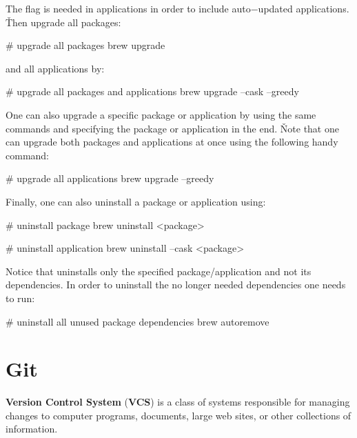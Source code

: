 The flag  is needed in applications in order to include auto$-$updated applications. \v

Then upgrade all packages:

\begin{bash}
# upgrade all packages
brew upgrade
\end{bash}

and all applications by:

\begin{bash}
# upgrade all packages and applications
brew upgrade --cask --greedy
\end{bash}

One can also upgrade a specific package or application by using the same commands and specifying the package or
application in the end. \v

Note that one can upgrade both packages and applications at once using the following handy command:

\begin{bash}
# upgrade all applications
brew upgrade --greedy
\end{bash}

Finally, one can also uninstall a package or application using:

\begin{bash}
# uninstall package
brew uninstall <package>
\end{bash}

\begin{bash}
# uninstall application
brew uninstall --cask <package>
\end{bash}

Notice that  uninstalls only the specified package/application and not its dependencies. In
order to uninstall the no longer needed dependencies one needs to run:

\begin{bash}
# uninstall all unused package dependencies
brew autoremove
\end{bash}

\section{Git}


\textbf{Version Control System} (\textbf{VCS}) is a class of systems responsible for managing changes to computer
programs, documents, large web sites, or other collections of information.
\ed

